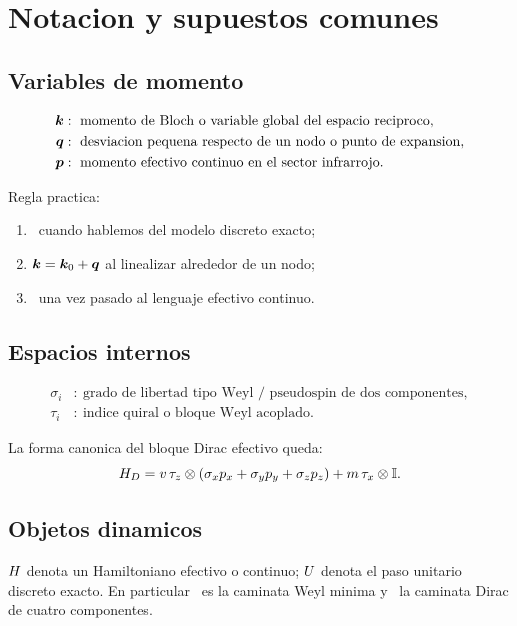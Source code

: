 \chapter{Notacion y supuestos comunes}
\label{ch:notacion}

\section{Variables de momento}

\begin{align}
\bm{k} &:\ \text{momento de Bloch o variable global del espacio reciproco},\\
\bm{q} &:\ \text{desviacion pequena respecto de un nodo o punto de expansion},\\
\bm{p} &:\ \text{momento efectivo continuo en el sector infrarrojo}.
\end{align}

Regla practica:
\begin{enumerate}[label=\arabic*.]
  \item \vk\ cuando hablemos del modelo discreto exacto;
  \item $\bm{k} = \bm{k}_0 + \bm{q}$ al linealizar alrededor de un nodo;
  \item \vp\ una vez pasado al lenguaje efectivo continuo.
\end{enumerate}

\section{Espacios internos}

\begin{align}
\sigma_i &:\ \text{grado de libertad tipo Weyl / pseudospin de dos componentes},\\
\tau_i   &:\ \text{indice quiral o bloque Weyl acoplado}.
\end{align}

La forma canonica del bloque Dirac efectivo queda:
\begin{equation}
H_{D} = v\,\tau_z\otimes(\sigma_x p_x + \sigma_y p_y + \sigma_z p_z)
      + m\,\tau_x \otimes \mathbb{I} .
\label{eq:HDcanon}
\end{equation}

\section{Objetos dinamicos}

\(H\) denota un Hamiltoniano efectivo o continuo; \(U\) denota el paso
unitario discreto exacto. En particular \UW\ es la caminata Weyl minima y
\UD\ la caminata Dirac de cuatro componentes.

